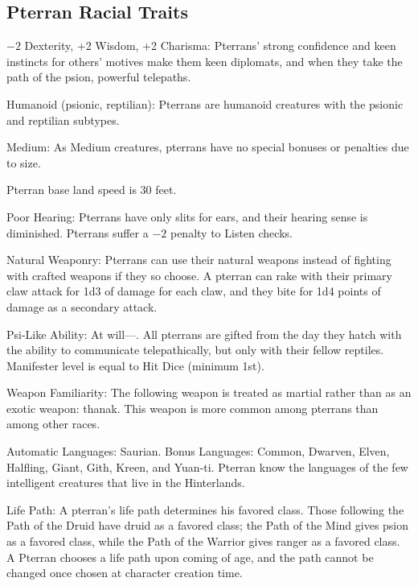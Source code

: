 \subsection{Pterran Racial Traits}
\begin{itemize*}
    \item $-2$ Dexterity, +2 Wisdom, +2 Charisma: Pterrans' strong confidence and keen instincts for others' motives make them keen diplomats, and when they take the path of the psion, powerful telepaths.
    \item Humanoid (psionic, reptilian): Pterrans are humanoid creatures with the psionic and reptilian subtypes.
    \item Medium: As Medium creatures, pterrans have no special bonuses or penalties due to size.
    \item Pterran base land speed is 30 feet.
    \item Poor Hearing: Pterrans have only slits for ears, and their hearing sense is diminished. Pterrans suffer a $-2$ penalty to Listen checks.
    \item Natural Weaponry: Pterrans can use their natural weapons instead of fighting with crafted weapons if they so choose. A pterran can rake with their primary claw attack for 1d3 of damage for each claw, and they bite for 1d4 points of damage as a secondary attack.
    \item Psi-Like Ability: At will---. All pterrans are gifted from the day they hatch with the ability to communicate telepathically, but only with their fellow reptiles. Manifester level is equal to \onehalf Hit Dice (minimum 1st).
    \item Weapon Familiarity: The following weapon is treated as martial rather than as an exotic weapon: thanak. This weapon is more common among pterrans than among other races.
    \item Automatic Languages: Saurian. Bonus Languages: Common, Dwarven, Elven, Halfling, Giant, Gith, Kreen, and Yuan-ti. Pterran know the languages of the few intelligent creatures that live in the Hinterlands.
    \item Life Path: A pterran's life path determines his favored class. Those following the Path of the Druid have druid as a favored class; the Path of the Mind gives psion as a favored class, while the Path of the Warrior gives ranger as a favored class. A Pterran chooses a life path upon coming of age, and the path cannot be changed once chosen at character creation time.
\end{itemize*}